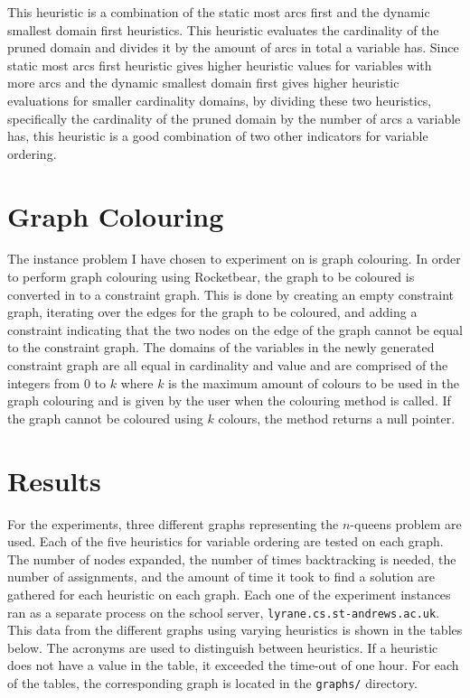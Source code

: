 \documentclass{article}
\begin{document}
This heuristic is a combination of the static most arcs first and the dynamic
smallest domain first heuristics. This heuristic evaluates the cardinality of
the pruned domain and divides it by the amount of arcs in total a variable has.
Since static most arcs first heuristic gives higher heuristic values for
variables with more arcs and the dynamic smallest domain first gives higher
heuristic evaluations for smaller cardinality domains, by dividing these two
heuristics, specifically the cardinality of the pruned domain by the number of
arcs a variable has, this heuristic is a good combination of two other
indicators for variable ordering.

\section{Graph Colouring}

\label{sec:colouring}

The instance problem I have chosen to experiment on is graph colouring. In
order to perform graph colouring using Rocketbear, the graph to be coloured is
converted in to a constraint graph. This is done by creating an empty
constraint graph, iterating over the edges for the graph to be coloured, and
adding a constraint indicating that the two nodes on the edge of the graph
cannot be equal to the constraint graph. The domains of the variables in the
newly generated constraint graph are all equal in cardinality and value and are
comprised of the integers from 0 to $k$ where $k$ is the maximum amount of
colours to be used in the graph colouring and is given by the user when the
colouring method is called. If the graph cannot be coloured using $k$ colours,
the method returns a null pointer.

\section{Results}

\label{sec:results}

For the experiments, three different graphs representing the $n$-queens problem
are used. Each of the five heuristics for variable ordering are tested on each
graph. The number of nodes expanded, the number of times backtracking is
needed, the number of assignments, and the amount of time it took to find a
solution are gathered for each heuristic on each graph. Each one of the
experiment instances ran as a separate process on the school server,
\verb|lyrane.cs.st-andrews.ac.uk|. This data from the different graphs using
varying heuristics is shown in the tables below. The acronyms are used to
distinguish between heuristics. If a heuristic does not have a value in the
table, it exceeded the time-out of one hour. For each of the tables, the
corresponding graph is located in the \verb|graphs/| directory.
\end{document}
